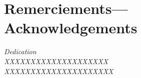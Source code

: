 \chapter*{Remerciements---Acknowledgements}

\cleardoublepage
\thispagestyle{empty}
\vspace*{6cm}
\begin{flushright}
\emph{Dedication\\
XXXXXXXXXXXXXXXXXXXX\\
XXXXXXXXXXXXXXXXXXXXX\\
}
\end{flushright}
\cleardoublepage